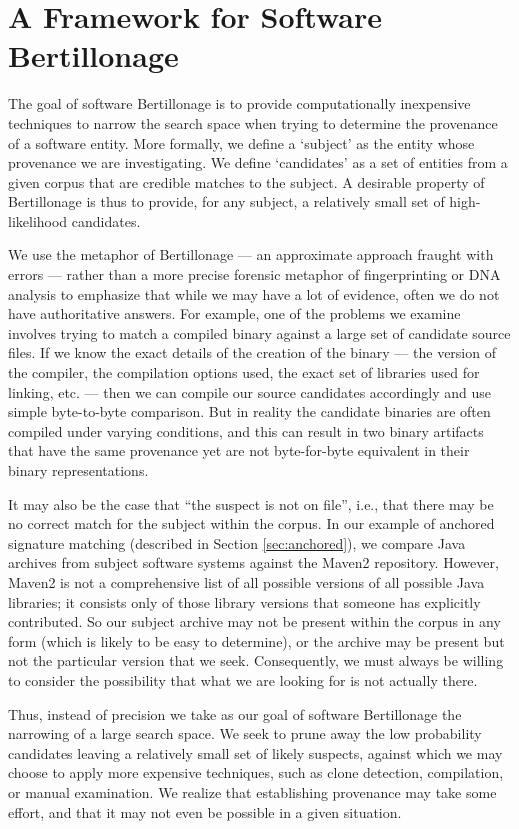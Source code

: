 \section{A Framework for Software Bertillonage}

The goal of software Bertillonage is to provide computationally inexpensive
techniques to narrow the search space when trying to determine the
provenance of a software entity.  More formally, we define a `subject' as
the entity whose provenance we are investigating.  We define `candidates'
as a set of entities from a given corpus that are credible matches to the
subject.  A desirable property of Bertillonage is thus to provide, for any
subject, a relatively small set of high-likelihood candidates.

We use the metaphor of Bertillonage --- an approximate approach fraught
with errors --- rather than a more precise forensic metaphor of
fingerprinting or DNA analysis to emphasize that while we may have a lot of
evidence, often we do not have authoritative answers.  For example, one of
the problems we examine involves trying to match a compiled binary against
a large set of candidate source files. If we know the exact details of the
creation of the binary --- the version of the compiler, the compilation
options used, the exact set of libraries used for linking, etc. --- then we
can compile our source candidates accordingly and use simple byte-to-byte
comparison.  But in reality the candidate binaries are often compiled under
varying conditions, and this can result in two binary artifacts that have
the same provenance yet are not byte-for-byte equivalent in their binary
representations.

It may also be the case that ``the suspect is not on file'', i.e., that
there may be no correct match for the subject within the corpus.  In our
example of anchored signature matching
(described in Section \ref{sec:anchored}),
we compare Java
archives from subject software systems against the Maven2 repository.
However, Maven2 is not a comprehensive list of all possible versions of all
possible Java libraries; it consists only of those library versions that
someone has explicitly contributed.  So our subject archive may not be
present within the corpus in any form (which is likely to be easy to
determine), or the archive may be present but not the particular version
that we seek.  Consequently, we must always be willing to consider the
possibility that what we are looking for is not actually there.

Thus, instead of precision we take as our goal of software Bertillonage the
narrowing of a large search space.  We seek to prune away the low
probability candidates leaving a relatively small set of likely suspects,
against which we may choose to apply more expensive techniques, such as
clone detection, compilation, or manual examination.  We realize that
establishing provenance may take some effort, and that it may not even be
possible in a given situation.


